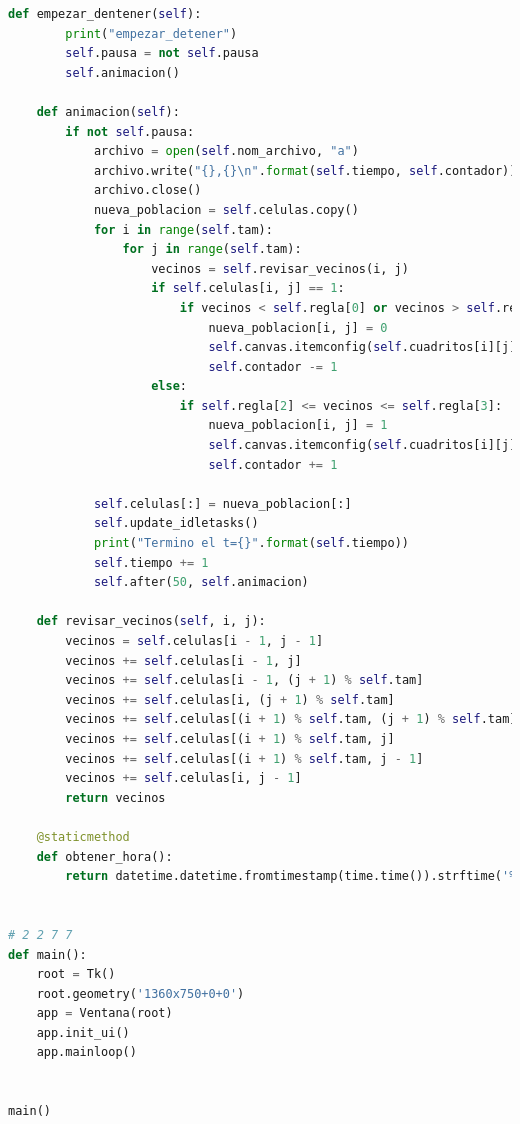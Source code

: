 \begin{lstlisting}[language=Python]
    def empezar_dentener(self):
        print("empezar_detener")
        self.pausa = not self.pausa
        self.animacion()

    def animacion(self):
        if not self.pausa:
            archivo = open(self.nom_archivo, "a")
            archivo.write("{},{}\n".format(self.tiempo, self.contador))
            archivo.close()
            nueva_poblacion = self.celulas.copy()
            for i in range(self.tam):
                for j in range(self.tam):
                    vecinos = self.revisar_vecinos(i, j)
                    if self.celulas[i, j] == 1:
                        if vecinos < self.regla[0] or vecinos > self.regla[1]:
                            nueva_poblacion[i, j] = 0
                            self.canvas.itemconfig(self.cuadritos[i][j], fill=self.ceros)
                            self.contador -= 1
                    else:
                        if self.regla[2] <= vecinos <= self.regla[3]:
                            nueva_poblacion[i, j] = 1
                            self.canvas.itemconfig(self.cuadritos[i][j], fill=self.unos)
                            self.contador += 1

            self.celulas[:] = nueva_poblacion[:]
            self.update_idletasks()
            print("Termino el t={}".format(self.tiempo))
            self.tiempo += 1
            self.after(50, self.animacion)

    def revisar_vecinos(self, i, j):
        vecinos = self.celulas[i - 1, j - 1]
        vecinos += self.celulas[i - 1, j]
        vecinos += self.celulas[i - 1, (j + 1) % self.tam]
        vecinos += self.celulas[i, (j + 1) % self.tam]
        vecinos += self.celulas[(i + 1) % self.tam, (j + 1) % self.tam]
        vecinos += self.celulas[(i + 1) % self.tam, j]
        vecinos += self.celulas[(i + 1) % self.tam, j - 1]
        vecinos += self.celulas[i, j - 1]
        return vecinos

    @staticmethod
    def obtener_hora():
        return datetime.datetime.fromtimestamp(time.time()).strftime('%Y-%m-%d_%H:%M:%S')


# 2 2 7 7
def main():
    root = Tk()
    root.geometry('1360x750+0+0')
    app = Ventana(root)
    app.init_ui()
    app.mainloop()


main()

\end{lstlisting}

